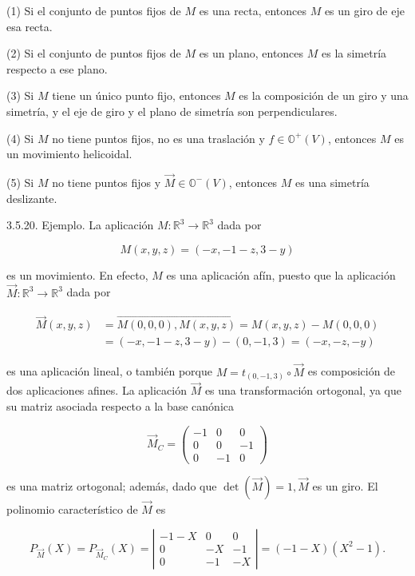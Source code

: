 \documentclass[12pt, a4paper, ones, notitlepage, openany,titlepage]{article}
\begin{document}
(1) Si el conjunto de puntos fijos de $M$ es una recta, entonces $M$ es un giro de eje esa recta.

(2) Si el conjunto de puntos fijos de $M$ es un plano, entonces $M$ es la simetría respecto a ese plano.

(3) Si $M$ tiene un único punto fijo, entonces $M$ es la composición de un giro y una simetría, y el eje de giro y el plano de simetría son perpendiculares.

(4) Si $M$ no tiene puntos fijos, no es una traslación y $f \in \mathbb{O}^{+}(V)$, entonces $M$ es un movimiento helicoidal.

(5) Si $M$ no tiene puntos fijos y $\overrightarrow{M} \in \mathbb{O}^{-}(V)$, entonces $M$ es una simetría deslizante.

3.5.20. Ejemplo. La aplicación $M: \mathbb{R}^{3} \rightarrow \mathbb{R}^{3}$ dada por

$$
M(x, y, z)=(-x,-1-z, 3-y)
$$

es un movimiento. En efecto, $M$ es una aplicación afín, puesto que la aplicación $\overrightarrow{M}: \mathbb{R}^{3} \rightarrow \mathbb{R}^{3}$ dada por

$$
\begin{aligned}
	\overrightarrow{M}(x, y, z) & =\overrightarrow{M(0,0,0), M(x, y, z)}=M(x, y, z)-M(0,0,0) \\
	& =(-x,-1-z, 3-y)-(0,-1,3)=(-x,-z,-y)
\end{aligned}
$$

es una aplicación lineal, o también porque $M=t_{(0,-1,3)} \circ \overrightarrow{M}$ es composición de dos aplicaciones afines. La aplicación $\overrightarrow{M}$ es una transformación ortogonal, ya que su matriz asociada respecto a la base canónica

$$
\overrightarrow{M}_{C}=\left(\begin{array}{rrr}
	-1 & 0 & 0 \\
	0 & 0 & -1 \\
	0 & -1 & 0
\end{array}\right)
$$

es una matriz ortogonal; además, dado que $\operatorname{det}(\overrightarrow{M})=1, \overrightarrow{M}$ es un giro. El polinomio característico de $\overrightarrow{M}$ es

$$
P_{\overrightarrow{M}}(X)=P_{\overrightarrow{M}_{C}}(X)=\left|\begin{array}{ccc}
	-1-X & 0 & 0 \\
	0 & -X & -1 \\
	0 & -1 & -X
\end{array}\right|=(-1-X)\left(X^{2}-1\right) .
$$
\end{document}
